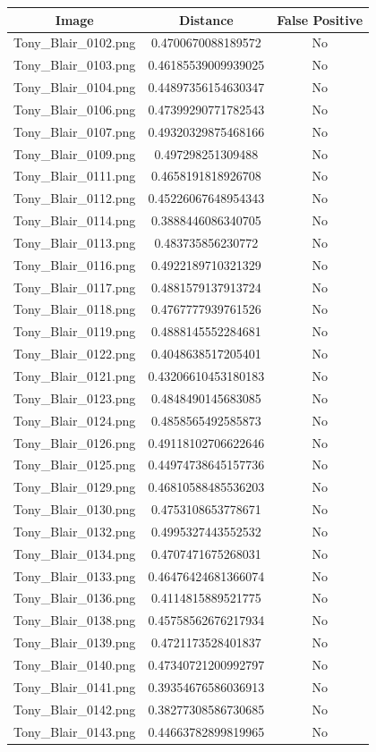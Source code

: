\documentclass[12pt]{article}
\begin{document}
\begin{center}
\begin{tabular}{ccc}
Image & Distance & False Positive \\
\hline
Tony\_Blair\_0102.png & 0.4700670088189572 & No\\
Tony\_Blair\_0103.png & 0.46185539009939025 & No\\
Tony\_Blair\_0104.png & 0.44897356154630347 & No\\
Tony\_Blair\_0106.png & 0.47399290771782543 & No\\
Tony\_Blair\_0107.png & 0.49320329875468166 & No\\
Tony\_Blair\_0109.png & 0.497298251309488 & No\\
Tony\_Blair\_0111.png & 0.4658191818926708 & No\\
Tony\_Blair\_0112.png & 0.45226067648954343 & No\\
Tony\_Blair\_0114.png & 0.3888446086340705 & No\\
Tony\_Blair\_0113.png & 0.483735856230772 & No\\
Tony\_Blair\_0116.png & 0.4922189710321329 & No\\
Tony\_Blair\_0117.png & 0.4881579137913724 & No\\
Tony\_Blair\_0118.png & 0.4767777939761526 & No\\
Tony\_Blair\_0119.png & 0.4888145552284681 & No\\
Tony\_Blair\_0122.png & 0.4048638517205401 & No\\
Tony\_Blair\_0121.png & 0.43206610453180183 & No\\
Tony\_Blair\_0123.png & 0.4848490145683085 & No\\
Tony\_Blair\_0124.png & 0.4858565492585873 & No\\
Tony\_Blair\_0126.png & 0.49118102706622646 & No\\
Tony\_Blair\_0125.png & 0.44974738645157736 & No\\
Tony\_Blair\_0129.png & 0.46810588485536203 & No\\
Tony\_Blair\_0130.png & 0.4753108653778671 & No\\
Tony\_Blair\_0132.png & 0.4995327443552532 & No\\
Tony\_Blair\_0134.png & 0.4707471675268031 & No\\
Tony\_Blair\_0133.png & 0.46476424681366074 & No\\
Tony\_Blair\_0136.png & 0.4114815889521775 & No\\
Tony\_Blair\_0138.png & 0.45758562676217934 & No\\
Tony\_Blair\_0139.png & 0.4721173528401837 & No\\
Tony\_Blair\_0140.png & 0.47340721200992797 & No\\
Tony\_Blair\_0141.png & 0.39354676586036913 & No\\
Tony\_Blair\_0142.png & 0.38277308586730685 & No\\
Tony\_Blair\_0143.png & 0.44663782899819965 & No\\
\end{tabular}
\end{center}
\end{document}
